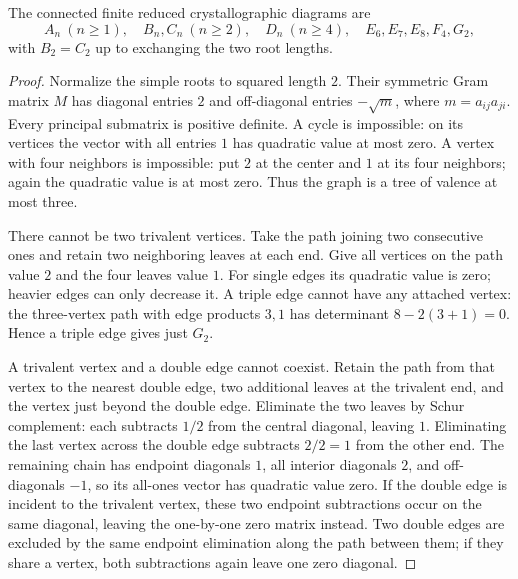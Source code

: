 \begin{theorem}\label{res:E05}
The connected finite reduced crystallographic diagrams are
\[
 A_n\ (n\ge1),\quad B_n,C_n\ (n\ge2),\quad D_n\ (n\ge4),
 \quad E_6,E_7,E_8,F_4,G_2,
\]
with \(B_2=C_2\) up to exchanging the two root lengths.
\end{theorem}
\begin{proof}
Normalize the simple roots to squared length \(2\).
Their symmetric Gram matrix \(M\) has diagonal entries \(2\)
and off-diagonal entries \(-\sqrt m\), where
\(m=a_{ij}a_{ji}\). Every principal submatrix is positive
definite. A cycle is impossible: on its vertices the vector
with all entries \(1\) has quadratic value at most zero.
A vertex with four neighbors is impossible: put \(2\) at
the center and \(1\) at its four neighbors; again the
quadratic value is at most zero.
Thus the graph is a tree of valence at most three.

There cannot be two trivalent vertices. Take the path joining
two consecutive ones and retain two neighboring leaves at
each end. Give all vertices on the path value \(2\) and
the four leaves value \(1\). For single edges its quadratic
value is zero; heavier edges can only decrease it.
A triple edge cannot have any attached vertex: the
three-vertex path with edge products \(3,1\) has determinant
\(8-2(3+1)=0\). Hence a triple edge gives just \(G_2\).

A trivalent vertex and a double edge cannot coexist.
Retain the path from that vertex to the nearest double edge,
two additional leaves at the trivalent end, and the vertex
just beyond the double edge. Eliminate the two leaves by
Schur complement: each subtracts \(1/2\) from the central
diagonal, leaving \(1\). Eliminating the last vertex across
the double edge subtracts \(2/2=1\) from the other end.
The remaining chain has endpoint diagonals \(1\), all interior
diagonals \(2\), and off-diagonals \(-1\), so its all-ones
vector has quadratic value zero. If the double edge is
incident to the trivalent vertex, these two endpoint
subtractions occur on the same diagonal, leaving the
one-by-one zero matrix instead. Two double edges are
excluded by the same endpoint elimination along
the path between them; if they share a vertex,
both subtractions again leave one zero diagonal.


\end{proof}

